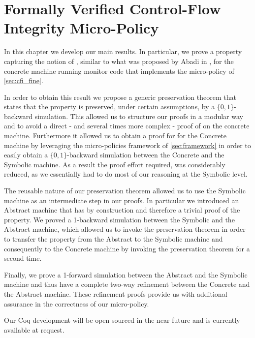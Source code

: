 \chapter{Formally Verified Control-Flow Integrity Micro-Policy}
\label{ch:verified_cfi}

In this chapter we develop our main results. In particular, we prove a
property capturing the notion of \CFI, similar to what was proposed by
Abadi \ETAL in \cite{AbadiBEL09}, for the concrete machine running
monitor code that implements the micro-policy of \cref{sec:cfi_fine}.

In order to obtain this result we propose a generic preservation
theorem that states that the \CFI property is preserved, under certain
assumptions, by a $\lbrace 0,1 \rbrace$-backward simulation. This
allowed us to structure our proofs in a modular way and to avoid a
direct - and several times more complex - proof of \CFI on the
concrete machine. Furthermore it allowed us to obtain a proof for \CFI
for the Concrete machine by leveraging the micro-policies framework of
\cref{sec:framework} in order to easily obtain a $\lbrace 0,1
\rbrace$-backward simulation between the Concrete and the Symbolic
machine. As a result the proof effort required, was considerably
reduced, as we essentially had to do most of our reasoning at the
Symbolic level.

The reusable nature of our preservation theorem allowed us to use the
Symbolic machine as an intermediate step in our proofs. In particular
we introduced an Abstract machine that has \CFI by construction and
therefore a trivial proof of the \CFI property.  We proved a
1-backward simulation between the Symbolic and the Abstract machine,
which allowed us to invoke the preservation theorem in order to
transfer the \CFI property from the Abstract to the Symbolic machine
and consequently to the Concrete machine by invoking the preservation
theorem for a second time.

Finally, we prove a 1-forward simulation between the Abstract and the
Symbolic machine and thus have a complete two-way refinement between
the Concrete and the Abstract machine. These refinement proofs provide
us with additional assurance in the correctness of our micro-policy.

Our Coq development will be open sourced in the near future and is
currently available at request.


